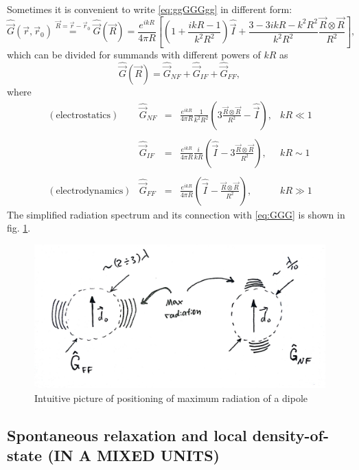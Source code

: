 Sometimes it is convenient to write  \eqref{eq:ggGGGgg} in different form:
\begin{equation}
	\hat{\vec{G}} (\vec{r}, \vec{r}_0) \overset{\vec{R} = \vec{r} - \vec{r}_0}{=} \hat{\vec{G}}(\vec{R}) = \frac{e^{ikR}}{4\pi R} \left[  \left( 1 + \frac{ikR - 1}{k^2R^2} \right) \hat{\vec{I}} + \frac{3 - 3ikR - k^2R^2}{k^2R^2} \frac{\vec{R}\otimes\vec{R}}{R^2} \right],
\end{equation}
which can be divided for summands with different powers of $kR$ as
\begin{equation}
	\hat{\vec{G}}(\vec{R}) = \hat{\vec{G}}_{NF} + \hat{\vec{G}}_{IF} + \hat{\vec{G}}_{FF},
	\label{eq:GGG}
\end{equation}
where
\begin{equation*}
	\begin{matrix}
		(\text{electrostatics}) & \hat{\vec{G}}_{NF} &=& \frac{e^{ikR}}{4\pi R} \frac{1}{k^2R^2} \left( 3 \frac{\vec{R}\otimes\vec{R}}{R^2} - \hat{\vec{I}} \right), & kR \ll 1 \\ \\
		& \hat{\vec{G}}_{IF} &=& \frac{e^{ikR}}{4\pi R} \frac{i}{kR}  \left( \hat{\vec{I}} - 3\frac{\vec{R}\otimes\vec{R}}{R^2} \right), & kR \sim 1 \\ \\
		(\text{electrodynamics})& \hat{\vec{G}}_{FF} &=& \frac{e^{ikR}}{4\pi R}  \left( \hat{\vec{I}} - \frac{\vec{R}\otimes\vec{R}}{R^2} \right), & kR \gg 1
	\end{matrix}
\end{equation*}
The simplified radiation spectrum and its connection with \eqref{eq:GGG} is shown in fig. \ref{fig:radiation1}.

\begin{figure}
	\centering
	\includegraphics[width=0.6\linewidth]{fig/L8/radiation_1}
	\caption{Intuitive picture of positioning of maximum radiation of a dipole}
	\label{fig:radiation1}
\end{figure}


\subsection{Spontaneous relaxation and local density-of-state (IN A MIXED UNITS)}

